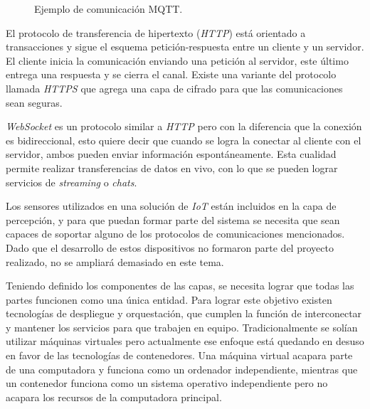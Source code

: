 \begin{figure}[h]
	\centering
	\caption{Ejemplo de comunicación MQTT.}
	\label{fig:ch1MqttEjemplo}
\end{figure}

El protocolo de transferencia de hipertexto (\emph{HTTP}) está orientado a transacciones y sigue el esquema petición-respuesta entre un cliente y un servidor.
El cliente inicia la comunicación enviando una petición al servidor, este último entrega una respuesta y se cierra el canal.
Existe una variante del protocolo llamada \emph{HTTPS} que agrega una capa de cifrado para que las comunicaciones sean seguras.

\emph{WebSocket} es un protocolo similar a \emph{HTTP} pero con la diferencia que la conexión es bidireccional, esto quiere decir que cuando se logra la conectar al cliente con el servidor, ambos pueden enviar información espontáneamente. Esta cualidad permite realizar transferencias de datos en vivo, con lo que se pueden lograr servicios de \emph{streaming} o \emph{chats}.

Los sensores utilizados en una solución de \emph{IoT} están incluidos en la capa de percepción, y para que puedan formar parte del sistema se necesita que sean capaces de soportar alguno de los protocolos de comunicaciones mencionados. Dado que el desarrollo de estos dispositivos no formaron parte del proyecto realizado, no se ampliará demasiado en este tema.

Teniendo definido los componentes de las capas, se necesita lograr que todas las partes funcionen como una única entidad. Para lograr este objetivo existen tecnologías de despliegue y orquestación, que cumplen la función de interconectar y mantener los servicios para que trabajen en equipo. Tradicionalmente se solían utilizar máquinas virtuales pero actualmente ese enfoque está quedando en desuso en favor de las tecnologías de contenedores. Una máquina virtual acapara parte de una computadora y funciona como un ordenador independiente, mientras que un contenedor funciona como un sistema operativo independiente pero no acapara los recursos de la computadora principal.


